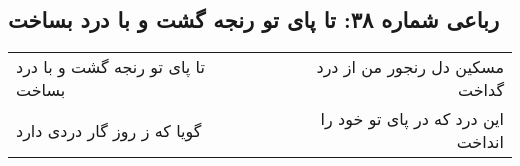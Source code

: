 \begin{center}
\section*{رباعی شماره ۳۸: تا پای تو رنجه گشت و با درد بساخت}
\label{sec:sh038}
\begin{longtable}{l p{0.5cm} r}
تا پای تو رنجه گشت و با درد بساخت
&&
مسکین دل رنجور من از درد گداخت
\\
گویا که ز روز گار دردی دارد
&&
این درد که در پای تو خود را انداخت
\\
\end{longtable}
\end{center}
